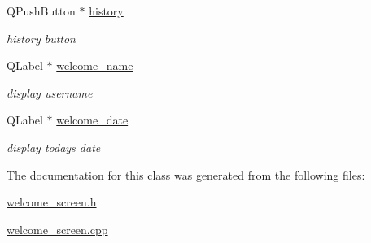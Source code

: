 \begin{DoxyCompactItemize}
Q\+Push\+Button $\ast$ \hyperlink{classwelcome__screen_adac0cf08c52076b3c53d5b866ede9ce5}{history}
\begin{DoxyCompactList}\small\item\em history button \end{DoxyCompactList}\item 
\mbox{\label{classwelcome__screen_a77da460d32a7f213ae4d65f1f2fff9e4}} 
Q\+Label $\ast$ \hyperlink{classwelcome__screen_a77da460d32a7f213ae4d65f1f2fff9e4}{welcome\+\_\+name}
\begin{DoxyCompactList}\small\item\em display username \end{DoxyCompactList}\item 
\mbox{\label{classwelcome__screen_aed9142c32b2a8e43c30450a74aebe8ac}} 
Q\+Label $\ast$ \hyperlink{classwelcome__screen_aed9142c32b2a8e43c30450a74aebe8ac}{welcome\+\_\+date}
\begin{DoxyCompactList}\small\item\em display today\textquotesingle{}s date \end{DoxyCompactList}\end{DoxyCompactItemize}


The documentation for this class was generated from the following files\+:\begin{DoxyCompactItemize}
\item 
\hyperlink{welcome__screen_8h}{welcome\+\_\+screen.\+h}\item 
\hyperlink{welcome__screen_8cpp}{welcome\+\_\+screen.\+cpp}\end{DoxyCompactItemize}
